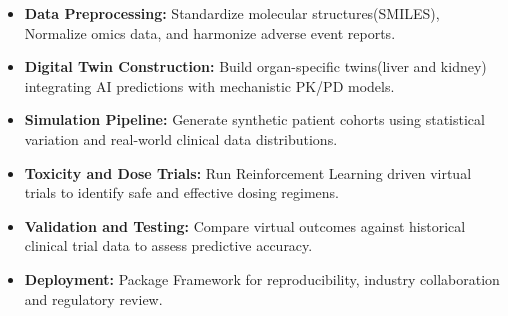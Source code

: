 \begin{itemize}
\begin{itemize}
        \item \textbf{Data Preprocessing:} Standardize molecular structures(SMILES), Normalize omics data, and harmonize adverse event reports.
        \item \textbf{Digital Twin Construction:} Build organ-specific twins(liver and kidney) integrating AI predictions with mechanistic PK/PD models.
        \item \textbf{Simulation Pipeline:} Generate synthetic patient cohorts using statistical variation and real-world clinical data distributions.
        \item \textbf{Toxicity and Dose Trials:} Run Reinforcement Learning driven virtual trials to identify safe and effective dosing regimens.
        \item \textbf{Validation and Testing:} Compare virtual outcomes against historical clinical trial data to assess predictive accuracy.
        \item \textbf{Deployment:} Package Framework for reproducibility, industry collaboration and regulatory review.
    \end{itemize}
\end{itemize}